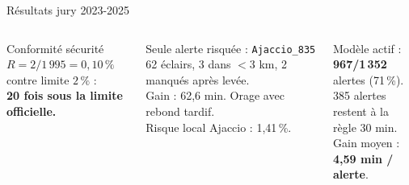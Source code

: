 \documentclass[aspectratio=169,t,11pt]{beamer}
\begin{document}
\begin{frame}[shrink=10]{Résultats jury 2023-2025}
\begin{columns}[T]
\begin{exampleblock}{Conformité sécurité}
\footnotesize
$R = 2/1\,995 = 0{,}10\,\%$ contre limite $2\,\%$ :\\
\textbf{20 fois sous la limite officielle.}
\end{exampleblock}
\vspace{2pt}
\begin{alertblock}{Seule alerte risquée : \texttt{Ajaccio\_835}}
\scriptsize
62 éclairs, 3 dans $<$3 km, 2 manqués après levée.\\
Gain : 62,6 min. Orage avec rebond tardif.\\
Risque local Ajaccio : 1,41\,\%.
\end{alertblock}
\vspace{2pt}
\begin{tcolorbox}[mybox,colback=metBlue!8,colframe=metBlue]
\scriptsize\centering
Modèle actif : \textbf{967/1\,352} alertes (71\,\%).\\
385 alertes restent à la règle 30 min.\\
Gain moyen : \textbf{4,59 min / alerte}.
\end{tcolorbox}
\end{columns}
\end{frame}
\end{document}
